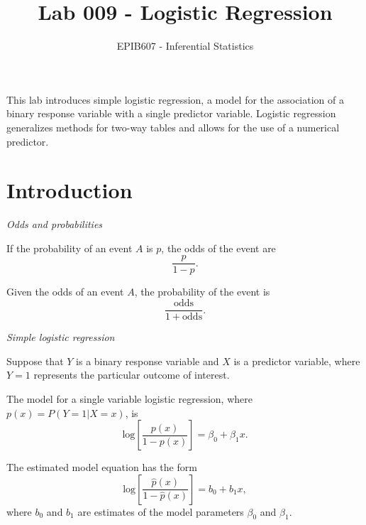 \documentclass[letterpaper,12pt,twoside,]{pinp}
\title{Lab 009 - Logistic Regression}
\author[a]{EPIB607 - Inferential Statistics}
\affil[a]{McGill University}
\begin{document}
\verticaladjustment{-2pt}

\maketitle
\thispagestyle{firststyle}



This lab introduces simple logistic regression, a model for the
association of a binary response variable with a single predictor
variable. Logistic regression generalizes methods for two-way tables and
allows for the use of a numerical predictor.

\hypertarget{introduction}{%
\section{Introduction}\label{introduction}}

\emph{Odds and probabilities}

If the probability of an event \(A\) is \(p\), the odds of the event are
\[\dfrac{p}{1 - p}. \]

Given the odds of an event \(A\), the probability of the event is
\[\dfrac{\text{odds}}{1 + \text{odds}}. \]

\emph{Simple logistic regression}

Suppose that \(Y\) is a binary response variable and \(X\) is a
predictor variable, where \(Y = 1\) represents the particular outcome of
interest.

The model for a single variable logistic regression, where
\(p(x) = P(Y = 1 | X = x)\), is
\[\text{log} \left[ \dfrac{p(x)}{1 - p(x)} \right] = \beta_0 + \beta_1 x.\]

The estimated model equation has the form
\[\text{log} \left[ \dfrac{\hat{p}(x)}{1 - \hat{p}(x)} \right] = b_0 + b_1 x, \]
where \(b_0\) and \(b_1\) are estimates of the model parameters
\(\beta_0\) and \(\beta_1\).
\end{document}
